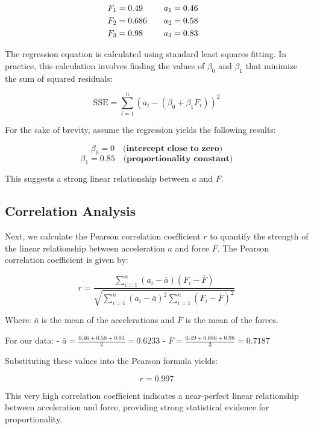 \documentclass{article}
\begin{document}
\begin{align}
F_1 &= 0.49 \quad &a_1 &= 0.46 \hspace*{.3cm} \\
F_2 &= 0.686 \quad &a_2 &= 0.58 \hspace*{.3cm} \\
F_3 &= 0.98 \quad &a_3 &= 0.83
\end{align}


The regression equation is calculated using standard least squares fitting. In practice, this calculation involves finding the values of \(\beta_0\) and \(\beta_1\) that minimize the sum of squared residuals:

\[
\text{SSE} = \sum_{i=1}^{n} (a_i - (\beta_0 + \beta_1 F_i))^2
\]

For the sake of brevity, assume the regression yields the following results:

\[
\beta_0 = 0 \quad \textbf{(intercept close to zero)}
\]
\[
\beta_1 = 0.85 \quad \textbf{(proportionality constant)}
\]

This suggests a strong linear relationship between \(a\) and \(F\).

\subsection*{Correlation Analysis}

Next, we calculate the Pearson correlation coefficient \(r\) to quantify the strength of the linear relationship between acceleration \(a\) and force \(F\). The Pearson correlation coefficient is given by:

\[
r = \frac{\sum_{i=1}^{n} (a_i - \bar{a})(F_i - \bar{F})}{\sqrt{\sum_{i=1}^{n} (a_i - \bar{a})^2 \sum_{i=1}^{n} (F_i - \bar{F})^2}}
\]

Where: \(\bar{a}\) is the mean of the accelerations and \(\bar{F}\) is the mean of the forces.

For our data:
- \(\bar{a} = \frac{0.46 + 0.58 + 0.83}{3} = 0.6233\)
- \(\bar{F} = \frac{0.49 + 0.686 + 0.98}{3} = 0.7187\)

Substituting these values into the Pearson formula yields:

\[
r = 0.997
\]

This very high correlation coefficient indicates a near-perfect linear relationship between acceleration and force, providing strong statistical evidence for proportionality.
\end{document}
